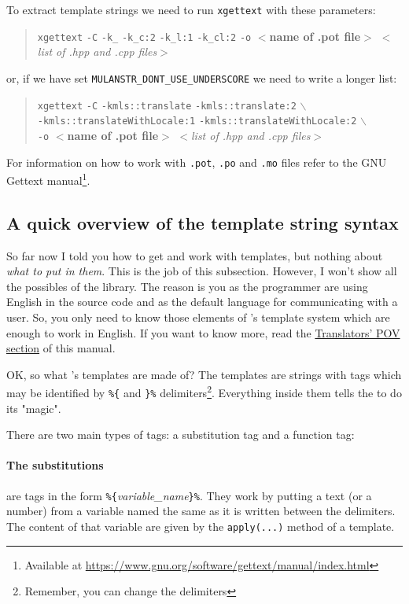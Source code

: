 To extract template strings we need to run \texttt{xgettext} with these parameters: 
\begin{quote}
	\texttt{xgettext} \verb+-C+ \verb+-k_+ \verb+-k_c:2+ \verb+-k_l:1+ \verb+-k_cl:2+ \texttt{-o} $<$\textbf{name of .pot file}$>$ $<$\textit{list of .hpp and .cpp files}$>$
\end{quote}
or, if we have set \verb+MULANSTR_DONT_USE_UNDERSCORE+ we need to write a longer list:
\begin{quote}
	\texttt{xgettext} \verb+-C+ \verb+-kmls::translate+ \verb+-kmls::translate:2+ $\backslash$ \\ \verb+-kmls::translateWithLocale:1+ \verb+-kmls::translateWithLocale:2+ $\backslash$ \\ \texttt{-o} $<$\textbf{name of .pot file}$>$ $<$\textit{list of .hpp and .cpp files}$>$
\end{quote}

For information on how to work with \texttt{.pot}, \texttt{.po} and \texttt{.mo} files refer to the GNU Gettext manual\footnote{Available at \url{https://www.gnu.org/software/gettext/manual/index.html}}.

\subsection{A quick overview of the template string syntax}
So far now I told you how to get and work with templates, but nothing about \emph{what to put in them}. 
This is the job of this subsection. However, I won't show all the possibles of the \mulan{} library.
The reason is you as the programmer are using English in the source code and as the default language for communicating with a user. 
So, you only need to know those elements of \mulan{}'s template system which are enough to work in English. 
If you want to know more, read the \hyperref[transPOV]{Translators' POV section} of this manual. 

OK, so what \mulan{}'s templates are made of? 
The templates are strings with tags which may be identified by \verb+%{+ and \verb+}%+ delimiters\footnote{Remember, you can change the delimiters}.
Everything inside them tells the \mulan{} to do its "magic". 

There are two main types of tags: a substitution tag and a function tag:
\paragraph{The substitutions} are tags in the form \verb+%{+\textit{variable\_name}\verb+}%+. They work by putting a text (or a number) from a variable named the same as it is written between the delimiters.
The content of that variable are given by the \verb+apply(...)+ method of a template. 

